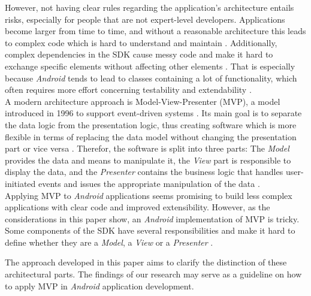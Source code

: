 However, not having clear rules regarding the application's architecture entails risks, especially for people that are not expert-level developers. Applications become larger from time to time, and without a reasonable architecture this leads to complex code which is hard to understand and maintain \cite{PassiveMVC, BallOfMud}. Additionally, complex dependencies in the SDK cause messy code and make it hard to exchange specific elements without affecting other elements \cite{PassiveMVC}. That is especially because \emph{Android} tends to lead to classes containing a lot of functionality, which often requires more effort concerning testability and extendability \cite{GangOfFour}. \\


A modern architecture approach is Model-View-Presenter (MVP), a model introduced in 1996 to support event-driven systems \cite{TaligentMVP}. Its main goal is to separate the data logic from the presentation logic, thus creating software which is more flexible in terms of replacing the data model without changing the presentation part or vice versa \cite{PassiveMVC}. Therefor, the software is split into three parts: The \emph{Model} provides the data and means to manipulate it, the \emph{View} part is responsible to display the data, and the \emph{Presenter} contains the business logic that handles user-initiated events and issues the appropriate manipulation of the data \cite{TaligentMVP}.\\


Applying MVP to \emph{Android} applications seems promising to build less complex applications with clear code and improved extensibility. However, as the considerations in this paper show, an \emph{Android} implementation of MVP is tricky. Some components of the SDK have several responsibilities and make it hard to define whether they are a \emph{Model}, a \emph{View} or a \emph{Presenter} \cite{PassiveMVC}. 

The approach developed in this paper aims to clarify the distinction of these architectural parts. The findings of our research may serve as a guideline on how to apply MVP in \emph{Android} application development.\\

